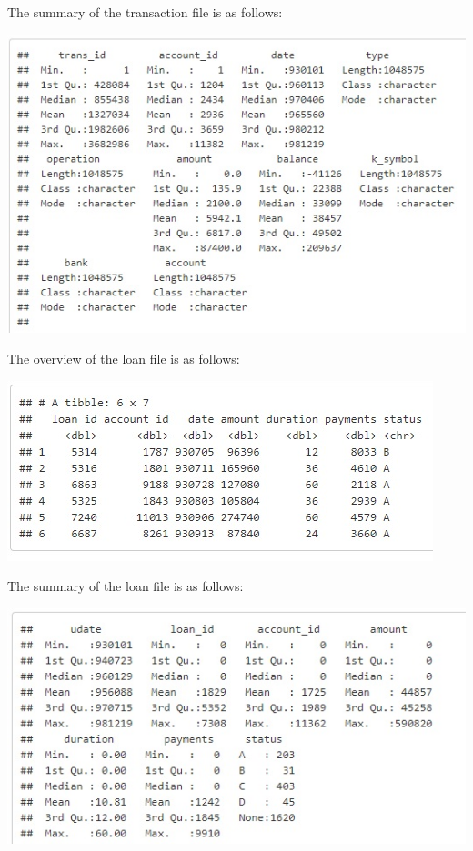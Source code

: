 The summary of the transaction file is as follows:
				\begin{center}
				\includegraphics[width=\linewidth]{figures/summary-transaction.jpg}	
				\label{fig: Description of Transaction File}
				\end{center}

The overview of the loan file is as follows:
				\begin{center}
				\includegraphics[width=\linewidth]{figures/description-loan.jpg}	
				\label{fig: Description of Loan File}
				\end{center}
The summary of the loan file is as follows:
				\begin{center}
				\includegraphics[width=\linewidth]{figures/summary-loan.jpg}	
				\label{fig: Description of Loan File}
				\end{center}



